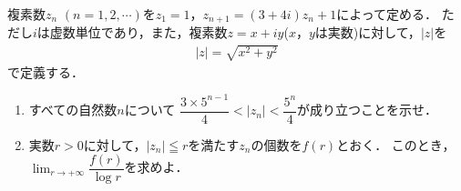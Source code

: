 \documentclass[../../main.tex]{subfiles}
\begin{document}
複素数$z_n$ $(n=1,2,\cdots)$を$z_1=1$，$z_{n+1}=(3+4i)z_n+1$によって定める．
ただし$i$は虚数単位であり，また，複素数$z=x+iy$($x$，$y$は実数)に対して，$|z|$を
\begin{align*}
  |z|=\sqrt{x^2+y^2}
\end{align*}
で定義する．
\begin{enumerate}
  \item すべての自然数$n$について
    $\displaystyle\dfrac{3\times5^{n-1}}{4}<|z_n|<\dfrac{5^n}{4}$が成り立つことを示せ．
  \item 実数$r>0$に対して，$|z_n| \leqq r$を満たす$z_n$の個数を$f(r)$とおく．
    このとき，$\displaystyle\lim_{r\to+\infty}\dfrac{f(r)}{\log r}$を求めよ．
\end{enumerate}
\end{document}
